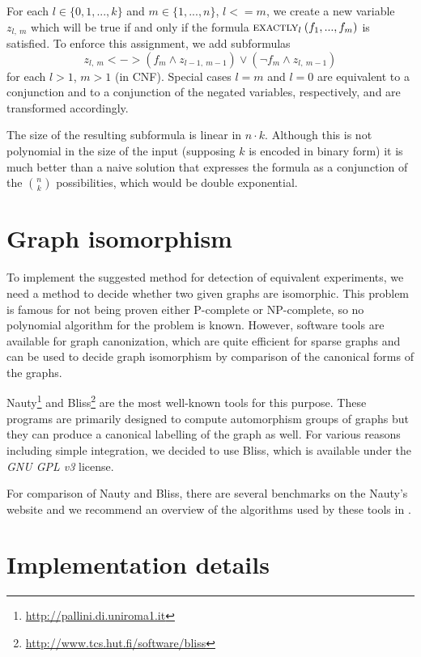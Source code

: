 For each $l\in\{0,1,...,k\}$ and $m\in\{1,...,n\}$, $l <= m$, we create
  a new variable $z_{l,\:m}$ which will be true if and only if
  the formula $\textsc{exactly}_{l}\:(f_1, ..., f_m)$ is satisfied.
To enforce this assignment, we add subformulas
  \[ z_{l,\:m} <-> (f_m \wedge z_{l-1,\:m-1}) \vee (\neg f_m \wedge z_{l,\:m-1}) \]
  for each $l > 1$, $m > 1$ (in CNF).
Special cases $l = m$ and $l = 0$ are equivalent to
  a conjunction and to a conjunction of the negated variables, respectively,
  and are transformed accordingly.

The size of the resulting subformula is linear in $n\cdot k$.
Although this is not polynomial in the size of the input
  (supposing $k$ is encoded in binary form)
  it is much better than a naive solution
  that expresses the formula as a conjunction of
  the $n\choose k$ possibilities,
  which would be double exponential.

\section{Graph isomorphism}

To implement the suggested method for detection of equivalent experiments,
  we need a method to decide whether two given graphs are isomorphic.
This problem is famous for not being proven either P-complete or
  NP-complete, so no polynomial algorithm for the problem is known.
However, software tools are available for graph canonization,
  which are quite efficient for sparse graphs and can be used to
  decide graph isomorphism by comparison of the canonical forms of the graphs.

Nauty\footnote{\url{http://pallini.di.uniroma1.it}}\cite{nauty} and
  Bliss\footnote{\url{http://www.tcs.hut.fi/software/bliss}}\cite{bliss}
  are the most well-known tools for this purpose.
These programs are primarily designed to compute automorphism groups of graphs
  but they can produce a canonical labelling of the graph as well.
For various reasons including simple integration, we decided to use Bliss,
  which is available under the \emph{GNU GPL v3} license.

For comparison of Nauty and Bliss,
  there are several benchmarks on the Nauty's website and
  we recommend an overview of the algorithms used by these tools
   in \cite{nautyblissoverview}.


\section{Implementation details} \label{sec:impl}

